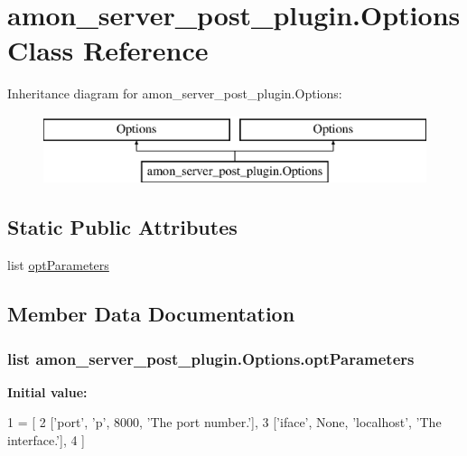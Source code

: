 \hypertarget{classamon__server__post__plugin_1_1_options}{\section{amon\-\_\-server\-\_\-post\-\_\-plugin.\-Options Class Reference}
\label{classamon__server__post__plugin_1_1_options}
}
Inheritance diagram for amon\-\_\-server\-\_\-post\-\_\-plugin.\-Options\-:\begin{figure}[H]
\begin{center}
\leavevmode
\includegraphics[height=2.000000cm]{classamon__server__post__plugin_1_1_options}
\end{center}
\end{figure}
\subsection*{Static Public Attributes}
\begin{DoxyCompactItemize}
\item 
list \hyperlink{classamon__server__post__plugin_1_1_options_af6fcb688391f41e537792928693a9623}{opt\-Parameters}
\end{DoxyCompactItemize}


\subsection{Member Data Documentation}
\hypertarget{classamon__server__post__plugin_1_1_options_af6fcb688391f41e537792928693a9623}{
\subsubsection[{opt\-Parameters}]{\setlength{\rightskip}{0pt plus 5cm}list amon\-\_\-server\-\_\-post\-\_\-plugin.\-Options.\-opt\-Parameters\hspace{0.3cm}{\ttfamily [static]}}}\label{classamon__server__post__plugin_1_1_options_af6fcb688391f41e537792928693a9623}
{\bfseries Initial value\-:}
\begin{DoxyCode}
1 = [
2         [\textcolor{stringliteral}{'port'}, \textcolor{stringliteral}{'p'}, 8000, \textcolor{stringliteral}{'The port number.'}],
3         [\textcolor{stringliteral}{'iface'}, \textcolor{keywordtype}{None}, \textcolor{stringliteral}{'localhost'}, \textcolor{stringliteral}{'The interface.'}],
4         ]
\end{DoxyCode}


